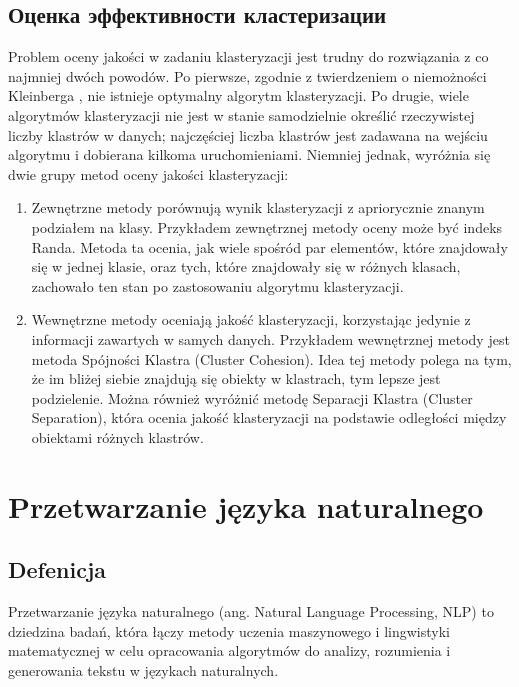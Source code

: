 	\subsection{Оценка эффективности кластеризации}
		Problem oceny jakości w zadaniu klasteryzacji jest trudny do rozwiązania z co najmniej dwóch powodów. Po pierwsze, zgodnie z twierdzeniem o niemożności Kleinberga \cite{Kleinberg}, nie istnieje optymalny algorytm klasteryzacji. Po drugie, wiele algorytmów klasteryzacji nie jest w stanie samodzielnie określić rzeczywistej liczby klastrów w danych; najczęściej liczba klastrów jest zadawana na wejściu algorytmu i dobierana kilkoma uruchomieniami.
		Niemniej jednak, wyróżnia się dwie grupy metod oceny jakości klasteryzacji:
		\begin{enumerate}
			\item Zewnętrzne metody porównują wynik klasteryzacji z apriorycznie znanym podziałem na klasy. Przykładem zewnętrznej metody oceny może być indeks Randa. Metoda ta ocenia, jak wiele spośród par elementów, które znajdowały się w jednej klasie, oraz tych, które znajdowały się w różnych klasach, zachowało ten stan po zastosowaniu algorytmu klasteryzacji.
			\item Wewnętrzne metody oceniają jakość klasteryzacji, korzystając jedynie z informacji zawartych w samych danych. Przykładem wewnętrznej metody jest metoda Spójności Klastra (Cluster Cohesion). Idea tej metody polega na tym, że im bliżej siebie znajdują się obiekty w klastrach, tym lepsze jest podzielenie. Można również wyróżnić metodę Separacji Klastra (Cluster Separation), która ocenia jakość klasteryzacji na podstawie odległości między obiektami różnych klastrów.
		\end{enumerate}


\section{Przetwarzanie języka naturalnego}

	\subsection{Defenicja}
		Przetwarzanie języka naturalnego (ang. Natural Language Processing, NLP) to dziedzina badań, która łączy metody uczenia maszynowego i lingwistyki matematycznej w celu opracowania algorytmów do analizy, rozumienia i generowania tekstu w językach naturalnych. \cite{NLP}


